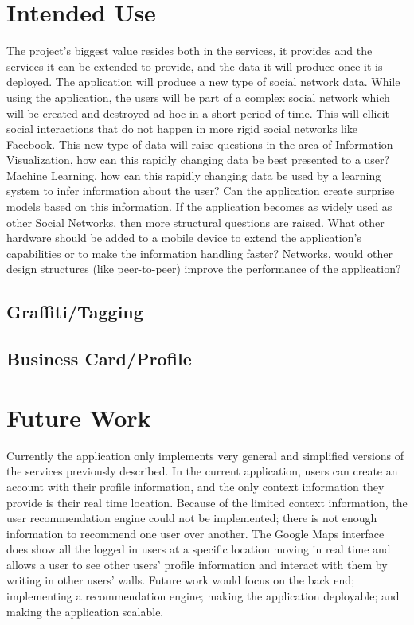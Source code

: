 \documentclass[11pt]{article}
\begin{document}
\section{Intended Use}




The project's biggest value resides both in the services, it provides and the services it can be extended to provide, and the data it will produce once it is deployed. The application will produce a new type of social network data. While using the application, the users will be part of a complex social network which will be created and destroyed ad hoc in a short period of time. This will ellicit social interactions that do not happen in more rigid social networks like Facebook. This new type of data will raise questions in the area of Information Visualization, how can this rapidly changing data be best presented to a user? Machine Learning, how can this rapidly changing data be used by a learning system to infer information about the user? Can the application create surprise models based on this information. If the application becomes as widely used as other Social Networks, then more structural questions are raised. What other hardware should be added to a mobile device to extend the application's capabilities or to make the information handling faster? Networks, would other design structures (like peer-to-peer) improve the performance of the application?


\subsection{Graffiti/Tagging}

\subsection{Business Card/Profile}


\section{Future Work}

Currently the application only implements very general and simplified versions of the services previously described. In the current application, users can create an account with their profile information, and the only context information they provide is their real time location. Because of the limited context information, the user recommendation engine could not be implemented; there is not enough information to recommend one user over another. The Google Maps interface does show all the logged in users at a specific location moving in real time and allows a user to see other users' profile information and interact with them by writing in other users' walls. Future work would focus on the back end; implementing a recommendation engine;  making the application deployable; and making the application scalable.
\end{document}
